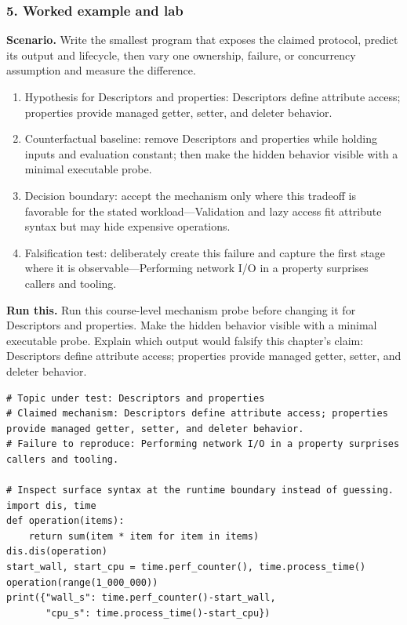 \subsubsection*{5. Worked example and lab}
\textbf{Scenario.} Write the smallest program that exposes the claimed protocol, predict its output and lifecycle, then vary one ownership, failure, or concurrency assumption and measure the difference.
\begin{enumerate}
\item Hypothesis for Descriptors and properties: Descriptors define attribute access; properties provide managed getter, setter, and deleter behavior.
\item Counterfactual baseline: remove Descriptors and properties while holding inputs and evaluation constant; then make the hidden behavior visible with a minimal executable probe.
\item Decision boundary: accept the mechanism only where this tradeoff is favorable for the stated workload—Validation and lazy access fit attribute syntax but may hide expensive operations.
\item Falsification test: deliberately create this failure and capture the first stage where it is observable—Performing network I/O in a property surprises callers and tooling.
\end{enumerate}
\textbf{Run this.} Run this course-level mechanism probe before changing it for Descriptors and properties. Make the hidden behavior visible with a minimal executable probe. Explain which output would falsify this chapter's claim: Descriptors define attribute access; properties provide managed getter, setter, and deleter behavior.
\begin{Verbatim}[fontsize=\scriptsize]
# Topic under test: Descriptors and properties
# Claimed mechanism: Descriptors define attribute access; properties provide managed getter, setter, and deleter behavior.
# Failure to reproduce: Performing network I/O in a property surprises callers and tooling.

# Inspect surface syntax at the runtime boundary instead of guessing.
import dis, time
def operation(items):
    return sum(item * item for item in items)
dis.dis(operation)
start_wall, start_cpu = time.perf_counter(), time.process_time()
operation(range(1_000_000))
print({"wall_s": time.perf_counter()-start_wall,
       "cpu_s": time.process_time()-start_cpu})
\end{Verbatim}

